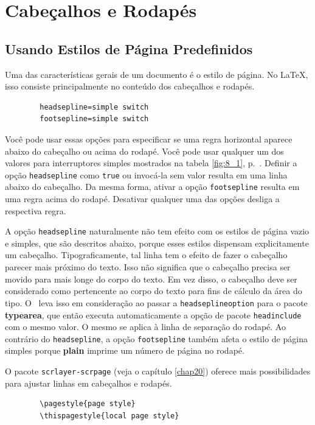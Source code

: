 \chapter{Cabeçalhos e Rodapés}
\section{Usando Estilos de Página Predefinidos}

Uma das características gerais de um documento é o estilo de página. No \LaTeX, isso consiste principalmente no conteúdo dos cabeçalhos e rodapés.
\begin{verbatim}
        headsepline=simple switch
        footsepline=simple switch
\end{verbatim}

Você pode usar essas opções para especificar se uma regra horizontal aparece abaixo do cabeçalho ou acima do rodapé. Você pode usar qualquer um dos valores para interruptores simples mostrados na tabela \ref{fig:8_1}, p.~\pageref{fig:8_1}. Definir a opção \texttt{headsepline} como \texttt{true} ou invocá-la sem valor resulta em uma linha abaixo do cabeçalho. Da mesma forma, ativar a opção \texttt{footsepline} resulta em uma regra acima do rodapé. Desativar qualquer uma das opções desliga a respectiva regra.

A opção \texttt{headsepline} naturalmente não tem efeito com os estilos de página vazio e simples, que são descritos abaixo, porque esses estilos dispensam explicitamente um cabeçalho. Tipograficamente, tal linha tem o efeito de fazer o cabeçalho parecer mais próximo do texto. Isso não significa que o cabeçalho precisa ser movido para mais longe do corpo do texto. Em vez disso, o cabeçalho deve ser considerado como pertencente ao corpo do texto para fins de cálculo da área do tipo. O \KOMAScript\ leva isso em consideração ao passar a \texttt{head\-sep\-li\-ne\-op\-tion} para o pacote \textbf{typearea}, que então executa automaticamente a opção de pacote \texttt{headinclude} com o mesmo valor. O mesmo se aplica à linha de separação do rodapé. Ao contrário do \texttt{headsepline}, a opção \texttt{footsepline} também afeta o estilo de página simples porque \textbf{plain} imprime um número de página no rodapé.

O pacote \texttt{scrlayer-scrpage} (veja o capítulo \ref{chap20}) oferece mais possibilidades para ajustar linhas em cabeçalhos e rodapés.
\begin{verbatim}
        \pagestyle{page style}
        \thispagestyle{local page style}
\end{verbatim}

